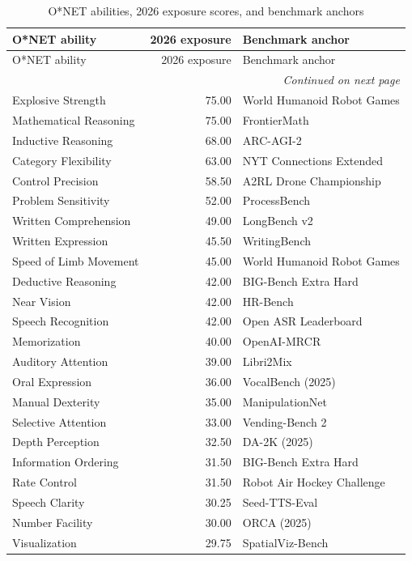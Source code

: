 \begin{longtable}{lrp{7cm}}
\caption{O*NET abilities, 2026 exposure scores, and benchmark anchors}\label{tab:anchors} \\ \toprule
O*NET ability & 2026 exposure & Benchmark anchor \\ \midrule \endfirsthead
\toprule O*NET ability & 2026 exposure & Benchmark anchor \\ \midrule \endhead
\midrule \multicolumn{3}{r}{\textit{Continued on next page}} \\ \endfoot
\bottomrule \endlastfoot
Explosive Strength & 75.00 & World Humanoid Robot Games \\
Mathematical Reasoning & 75.00 & FrontierMath \\
Inductive Reasoning & 68.00 & ARC-AGI-2 \\
Category Flexibility & 63.00 & NYT Connections Extended \\
Control Precision & 58.50 & A2RL Drone Championship \\
Problem Sensitivity & 52.00 & ProcessBench \\
Written Comprehension & 49.00 & LongBench v2 \\
Written Expression & 45.50 & WritingBench \\
Speed of Limb Movement & 45.00 & World Humanoid Robot Games \\
Deductive Reasoning & 42.00 & BIG-Bench Extra Hard \\
Near Vision & 42.00 & HR-Bench \\
Speech Recognition & 42.00 & Open ASR Leaderboard \\
Memorization & 40.00 & OpenAI-MRCR \\
Auditory Attention & 39.00 & Libri2Mix \\
Oral Expression & 36.00 & VocalBench (2025) \\
Manual Dexterity & 35.00 & ManipulationNet \\
Selective Attention & 33.00 & Vending-Bench 2 \\
Depth Perception & 32.50 & DA-2K (2025) \\
Information Ordering & 31.50 & BIG-Bench Extra Hard \\
Rate Control & 31.50 & Robot Air Hockey Challenge \\
Speech Clarity & 30.25 & Seed-TTS-Eval \\
Number Facility & 30.00 & ORCA (2025) \\
Visualization & 29.75 & SpatialViz-Bench \\

\end{longtable}
